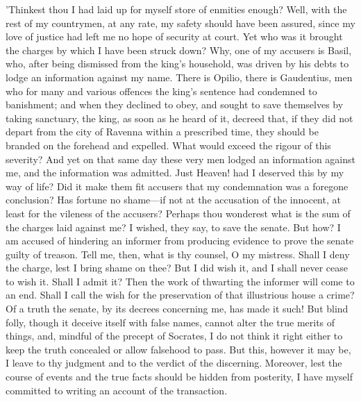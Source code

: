 'Thinkest thou I had laid up for myself store of enmities enough? Well,
with the rest of my countrymen, at any rate, my safety should have been
assured, since my love of justice had left me no hope of security at
court. Yet who was it brought the charges by which I have been struck
down? Why, one of my accusers is Basil, who, after being dismissed from
the king's household, was driven by his debts to lodge an information
against my name. There is Opilio, there is Gaudentius, men who for many
and various offences the king's sentence had condemned to banishment;
and when they declined to obey, and sought to save themselves by taking
sanctuary, the king, as soon as he heard of it, decreed that, if they
did not depart from the city of Ravenna within a prescribed time, they
should be branded on the forehead and expelled. What would exceed the
rigour of this severity? And yet on that same day these very men lodged
an information against me, and the information was admitted. Just
Heaven! had I deserved this by my way of life? Did it make them fit
accusers that my condemnation was a foregone conclusion? Has fortune no
shame—if not at the accusation of the innocent, at least for the
vileness of the accusers? Perhaps thou wonderest what is the sum of the
charges laid against me? I wished, they say, to save the senate. But
how? I am accused of hindering an informer from producing evidence to
prove the senate guilty of treason. Tell me, then, what is thy counsel,
O my mistress. Shall I deny the charge, lest I bring shame on thee? But
I did wish it, and I shall never cease to wish it. Shall I admit it?
Then the work of thwarting the informer will come to an end. Shall I
call the wish for the preservation of that illustrious house a crime?
Of a truth the senate, by its decrees concerning me, has made it such!
But blind folly, though it deceive itself with false names, cannot alter
the true merits of things, and, mindful of the precept of Socrates, I do
not think it right either to keep the truth concealed or allow falsehood
to pass. But this, however it may be, I leave to thy judgment and to the
verdict of the discerning. Moreover, lest the course of events and the
true facts should be hidden from posterity, I have myself committed to
writing an account of the transaction.

